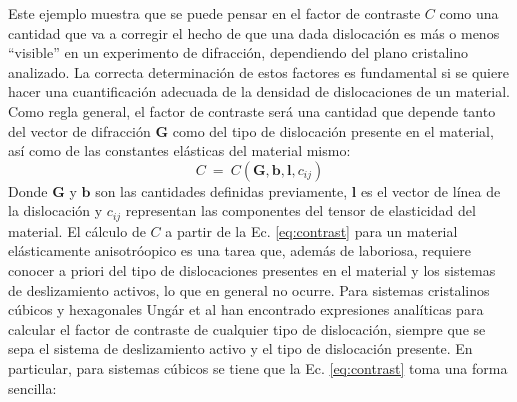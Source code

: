 Este ejemplo muestra que se puede pensar en el factor de contraste $C$ como una cantidad que va a corregir el hecho de que una dada dislocación es más o menos ``visible'' en un experimento de difracción, dependiendo del plano cristalino analizado.
La correcta determinación de estos factores es fundamental si se quiere hacer una cuantificación adecuada de la densidad de dislocaciones de un material.
Como regla general, el factor de contraste será una cantidad que depende tanto del vector de difracción $\mathbf{G}$ como del tipo de dislocación presente en el material, así como de las constantes elásticas del material mismo:
\begin{equation}
  C \ = \ C(\mathbf{G},\mathbf{b},\mathbf{l},c_{ij})
  \label{eq:contrast}
\end{equation}
\noindent
Donde $\mathbf{G}$ y $\mathbf{b}$ son las cantidades definidas previamente, $\mathbf{l}$ es el vector de línea de la dislocación y $c_{ij}$ representan las componentes del tensor de elasticidad del material.
El cálculo de $C$ a partir de la Ec. \ref{eq:contrast} para un material elásticamente anisotróopico es una tarea que, además de laboriosa, requiere conocer a priori del tipo de dislocaciones presentes en el material y los sistemas de deslizamiento activos, lo que en general no ocurre.
Para sistemas cristalinos cúbicos y hexagonales Ungár et al\cite{Dragomir1999,Dragomir2002} han encontrado expresiones analíticas para calcular el factor de contraste de cualquier tipo de dislocación, siempre que se sepa el sistema de deslizamiento activo y el tipo de dislocación presente. En particular, para sistemas cúbicos se tiene que la Ec. \ref{eq:contrast} toma una forma sencilla:

